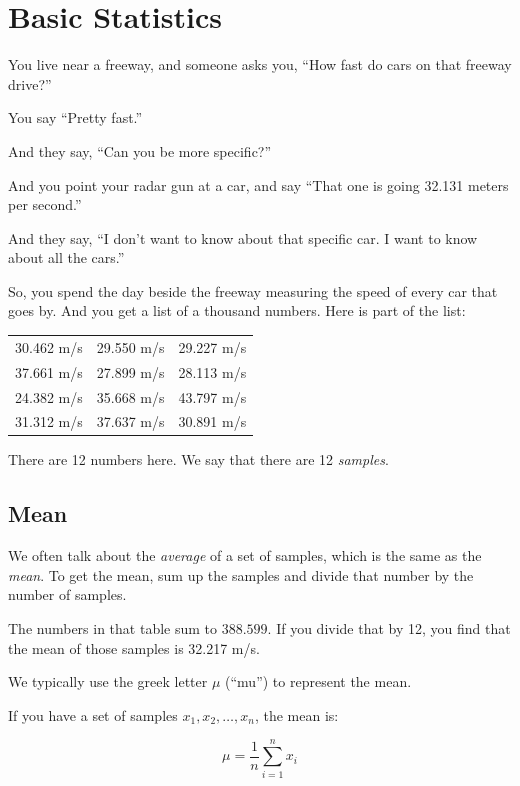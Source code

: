 \chapter{Basic Statistics}

You live near a freeway, and someone asks you, ``How fast do cars on that freeway drive?''

You say ``Pretty fast.''

And they say, ``Can you be more specific?''

And you point your radar gun at a car, and say ``That one is going 32.131 meters per second.''

And they say, ``I don't want to know about that specific car. I want to know about all the cars.''

So, you spend the day beside the freeway measuring the speed of every
car that goes by. And you get a list of a thousand numbers. Here is part of the
list:

\begin{tabular}{c | c | c}
30.462 m/s  & 29.550 m/s & 29.227 m/s \\
37.661 m/s  & 27.899 m/s & 28.113 m/s \\
24.382 m/s & 35.668 m/s & 43.797 m/s \\
31.312 m/s & 37.637 m/s & 30.891 m/s
\end {tabular}

There are 12 numbers here. We say that there are 12 \textit{samples}.

\section{Mean}

We often talk about the \textit{average} of a set of samples, which is the 
same as the \textit{mean}. To get the mean, sum up the
samples and divide that number by the number of samples.

The numbers in that table sum to $388.599$.  If you divide that by 12,
you find that the mean of those samples is 32.217 m/s.

We typically use the greek letter $\mu$ (``mu'') to represent the mean.

\begin{mdframed}[style=important, frametitle={Definition of Mean}]
  
If you have a set of samples $x_1, x_2, \ldots, x_n$, the mean is:

$$ \mu = \frac{1}{n} \sum_{i=1}^n x_i$$

\end{mdframed}

